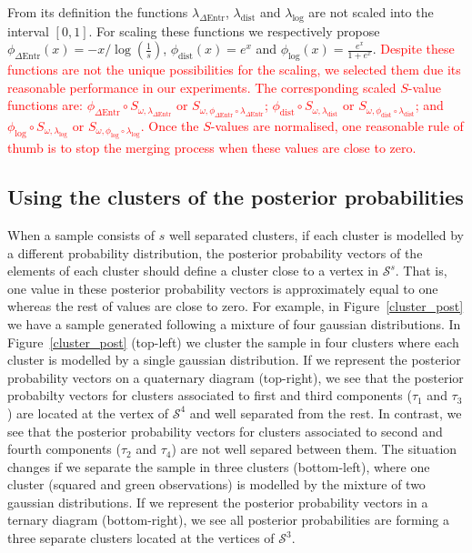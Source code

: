 \documentclass[submit]{smj}
\theoremstyle{definition}
\begin{document}
From its definition the functions $\lambda_{\Delta\text{Entr}}$, $\lambda_{\text{dist}}$ and 
$\lambda_{\log}$ are not scaled into the interval $\left[0,1\right]$. For scaling these functions we respectively propose  $\phi_{\Delta\text{Entr}}(x) = -x/{\log(\frac{1}{s})}$, $\phi_{\text{dist}}(x) = e^x$ and $\phi_{\log}(x) = \frac{e^x}{1+e^x}$. \textcolor{red}{Despite these functions are not the unique possibilities for the scaling, we selected them due its reasonable performance in our experiments. The corresponding scaled $S$-value functions are: 
  $\phi_{\Delta\text{Entr}} \circ S_{\omega, \lambda_{\Delta\text{Entr}}}$ or $S_{\omega, \phi_{\Delta\text{Entr}} \circ \lambda_{\Delta\text{Entr}}}$; $\phi_{\text{dist}} \circ S_{\omega, \lambda_{\text{dist}}}$ or $S_{\omega, \phi_{\text{dist}} \circ \lambda_{\text{dist}}}$; and $\phi_{\log} \circ S_{\omega, \lambda_{\log}}$ or $S_{\omega, \phi_{\log} \circ \lambda_{\log}}$. Once the $S$-values are normalised, one reasonable rule of thumb is to stop the merging process when these values are close to zero.}

\subsection{Using the clusters of the posterior probabilities}\label{coda_clusters}

When a sample consists of $s$ well separated clusters, if each cluster is modelled by a different probability distribution, the posterior probability vectors of the elements of each cluster should define a cluster close to a vertex in $\mathcal{S}^s$. That is, one value in these posterior probability vectors is approximately equal to one whereas the rest of values are close to zero. For example, in Figure~\ref{cluster_post} we have a sample generated following a mixture of four gaussian distributions. In Figure~\ref{cluster_post} (top-left) we cluster the sample in four clusters where each cluster is modelled by a single gaussian distribution. If we represent the posterior probability vectors on a quaternary diagram (top-right), we see that the posterior probabilty vectors for clusters associated to first and third components ($\tau_1$ and $\tau_3$) are located at the vertex of $\mathcal{S}^4$ and well separated from the rest. In contrast, we see that the posterior probability vectors for clusters associated to second and fourth components ($\tau_2$ and $\tau_4$) are not well separed between them. The situation changes if we separate the sample in three clusters (bottom-left), where one cluster (squared and green observations) is modelled by the mixture of two gaussian distributions. If we represent the posterior probability vectors in a ternary diagram (bottom-right), we see all posterior probabilities are forming a three separate clusters located at the vertices of $\mathcal{S}^3$.
\end{document}
